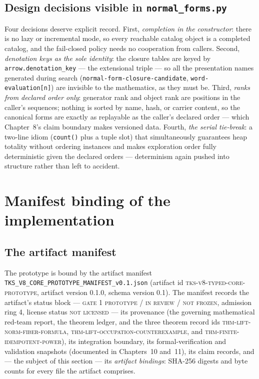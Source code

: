\subsection{Design decisions visible in \texttt{normal\_forms.py}}

Four decisions deserve explicit record. First, \emph{completion in the
constructor}: there is no lazy or incremental mode, so every reachable
catalog object is a completed catalog, and the fail-closed policy needs no
cooperation from callers. Second, \emph{denotation keys as the sole
identity}: the closure tables are keyed by
\texttt{arrow.denotation\_key} --- the extensional triple --- so all the
presentation names generated during search
(\texttt{normal-form-closure-candidate}, \texttt{word-evaluation[n]}) are
invisible to the mathematics, as they must be. Third, \emph{ranks from
declared order only}: generator rank and object rank are positions in the
caller's sequences; nothing is sorted by name, hash, or carrier content,
so the canonical forms are exactly as replayable as the caller's declared
order --- which Chapter~8's claim boundary makes versioned data. Fourth,
\emph{the serial tie-break}: a two-line idiom (\texttt{count()} plus a
tuple slot) that simultaneously guarantees heap totality without ordering
instances and makes exploration order fully deterministic given the
declared orders --- determinism again pushed into structure rather than
left to accident.

\section{Manifest binding of the implementation}\label{ch09:sec:manifest}

\subsection{The artifact manifest}

The prototype is bound by the artifact manifest
\texttt{TKS\_V8\_CORE\_PROTOTYPE\_MANIFEST\_v0.1.json} (artifact id
\textsc{tks-v8-typed-core-prototype}, artifact version 0.1.0, schema
version 0.1). The manifest records the artifact's status block ---
\textsc{gate 1 prototype / in review / not frozen}, admission ring 4,
license status \textsc{not licensed} --- its provenance (the governing
mathematical red-team report, the theorem ledger, and the three theorem
record ids \textsc{thm-lift-norm-fiber-formula},
\textsc{thm-lift-occupation-counterexample}, and
\textsc{thm-finite-idempotent-power}), its integration boundary, its
formal-verification and validation snapshots (documented in Chapters~10
and~11), its claim records, and --- the subject of this section --- its
\emph{artifact bindings}: SHA-256 digests and byte counts for every file
the artifact comprises.

